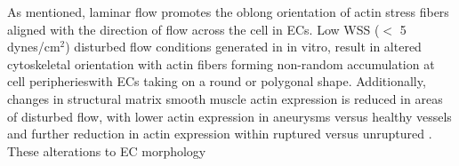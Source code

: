 As mentioned, laminar flow promotes the oblong orientation of actin stress fibers aligned with the direction of flow across the cell in ECs. Low WSS ($<$ 5 dynes/cm$^2$) disturbed flow conditions generated in in vitro, result in altered cytoskeletal orientation with actin fibers forming non-random accumulation at cell peripheries\cite{balaguru2016disturbed,lay2019arhgap18,wong2016parallel}with ECs taking on a round or polygonal shape. Additionally, changes in structural matrix smooth muscle actin expression is reduced in areas of disturbed flow, with lower actin expression in aneurysms versus healthy vessels and further reduction in actin expression within ruptured versus unruptured \cite{aneurysmsvanrossomme2015intracranial}. These alterations to EC morphology 
 





